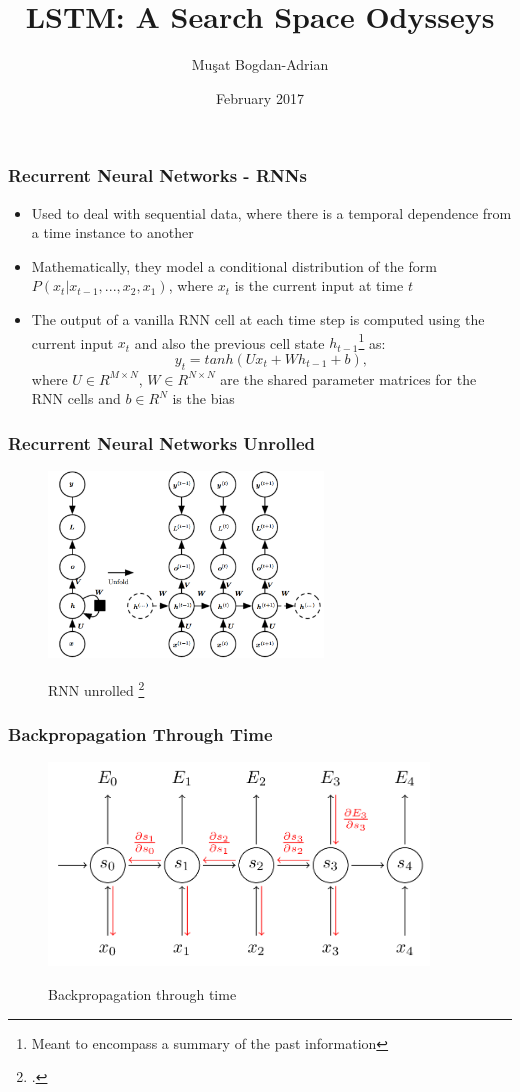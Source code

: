 \documentclass{beamer}
\title[LSTM: A Search Space Odysseys]{LSTM: A Search Space Odysseys}
\author[Mu\c sat Bogdan-Adrian]{Mu\c sat Bogdan-Adrian}
\date{February 2017}
\begin{document}
\frame{\titlepage}

\begin{frame}
\frametitle{Recurrent Neural Networks - RNNs}
\center
\begin{itemize}
	\item Used to deal with sequential data, where there is a temporal dependence from a time instance to another
	\item Mathematically, they model a conditional distribution of the form \(P(x_t \lvert x_{t-1},..., x_2, x_1) \), where \(x_t\) is the current input at time \(t\)
	\item The output of a vanilla RNN cell at each time step is computed using the current input \(x_t\) and also the previous cell state \(h_{t-1}\)\footnote{Meant to encompass a summary of the past information} as:
	\[
		y_t = tanh(Ux_t + Wh_{t-1} + b),
	\]
	where \(U \in R^{M \times N}\), \(W \in R^{N \times N}\) are the shared parameter matrices for the RNN cells and \(b \in R^N\) is the bias
\end{itemize}
\end{frame}

\begin{frame}
\frametitle{Recurrent Neural Networks Unrolled}
\begin{figure}
        {\includegraphics[width=0.65\textwidth]{rnn_unrolled.png}}
        \caption{RNN unrolled \footcite{Goodfellow-et-al-2016}}
    \end{figure}
\end{frame}

\begin{frame}
\frametitle{Backpropagation Through Time}
\begin{figure}
        {\includegraphics[width=0.9\textwidth]{bptt.png}}
        \caption{Backpropagation through time}
    \end{figure}
\end{frame}
\end{document}
